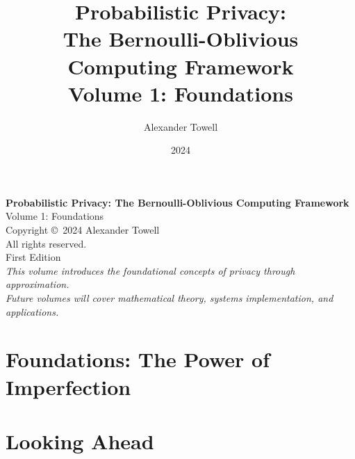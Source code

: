 \documentclass[11pt,oneside]{book}
\title{Probabilistic Privacy:\\
\Large The Bernoulli-Oblivious Computing Framework\\
\vspace{1cm}
\huge \textbf{Volume 1: Foundations}}
\author{Alexander Towell}
\date{2024}
\begin{document}
\frontmatter
\maketitle

\thispagestyle{empty}
\vspace*{\fill}
\begin{center}
\textbf{Probabilistic Privacy: The Bernoulli-Oblivious Computing Framework}\\
Volume 1: Foundations\\
\vspace{0.5cm}
Copyright \copyright\ 2024 Alexander Towell\\
All rights reserved.\\
\vspace{0.5cm}
First Edition\\
\vspace{1cm}
\textit{This volume introduces the foundational concepts of privacy through approximation.\\
Future volumes will cover mathematical theory, systems implementation, and applications.}
\end{center}
\vspace*{\fill}
\clearpage

\tableofcontents



\mainmatter

\part{Foundations: The Power of Imperfection}







\part{Looking Ahead}



\appendix




\backmatter

\printindex
\end{document}

